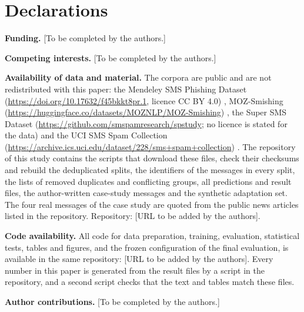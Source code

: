 \section*{Declarations}

{\raggedright

\noindent\textbf{Funding.} [To be completed by the authors.]

\medskip
\noindent\textbf{Competing interests.} [To be completed by the authors.]

\medskip
\noindent\textbf{Availability of data and material.} The corpora are public and are not redistributed with this paper: the Mendeley SMS Phishing Dataset (\url{https://doi.org/10.17632/f45bkkt8pr.1}, licence CC BY 4.0) \cite{mendeley2022}, MOZ-Smishing (\url{https://huggingface.co/datasets/MOZNLP/MOZ-Smishing}) \cite{moz2025}, the Super SMS Dataset (\url{https://github.com/smspamresearch/spstudy}; no licence is stated for the data) \cite{salman2024} and the UCI SMS Spam Collection (\url{https://archive.ics.uci.edu/dataset/228/sms+spam+collection}) \cite{almeida2011}. The repository of this study contains the scripts that download these files, check their checksums and rebuild the deduplicated splits, the identifiers of the messages in every split, the lists of removed duplicates and conflicting groups, all predictions and result files, the author-written case-study messages and the synthetic adaptation set. The four real messages of the case study are quoted from the public news articles listed in the repository. Repository: [URL to be added by the authors].

\medskip
\noindent\textbf{Code availability.} All code for data preparation, training, evaluation, statistical tests, tables and figures, and the frozen configuration of the final evaluation, is available in the same repository: [URL to be added by the authors]. Every number in this paper is generated from the result files by a script in the repository, and a second script checks that the text and tables match these files.

\medskip
\noindent\textbf{Author contributions.} [To be completed by the authors.]\par
}
